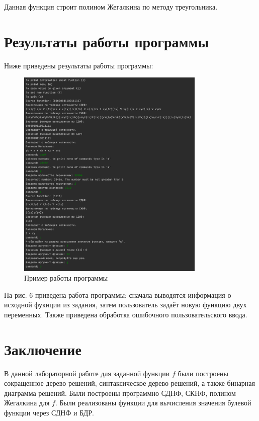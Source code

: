 \documentclass[a4paper]{article}
\theoremstyle{plain}
\theoremstyle{definition*}
\theoremstyle{remark}
\begin{document}
Данная функция строит полином Жегалкина по методу треугольника. 

\newpage
\section{Результаты работы программы}
Ниже приведены результаты работы программы: 
\begin{figure}[htpb]
    \centering
    \includegraphics[width=0.8\textwidth]{pics/work}
    \caption{Пример работы программы}
    \label{fig:work}
\end{figure}

На рис. 6 приведена работа программы: сначала выводятся информация
о исходной фукнции из задания, затем пользователь задаёт новую 
функцию двух переменных. Также приведена обработка ошибочного 
пользовательского ввода. 

\newpage
\section*{Заключение}
В данной лабораторной работе для заданной функции $\displaystyle f$ были 
построены сокращенное дерево 
решений, синтаксическое дерево решений, а также бинарная диаграмма
решений. Были построены программно СДНФ, СКНФ, полином Жегалкина для
$\displaystyle f$. 
Были реализованы функции для вычисления значения булевой функции 
через СДНФ и БДР. 
\end{document}
